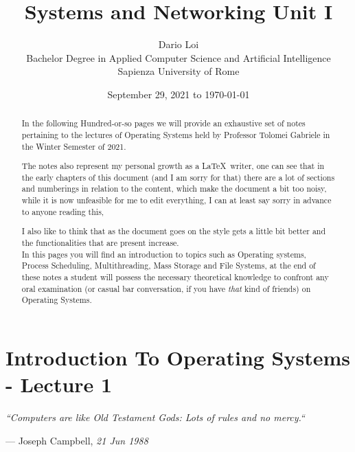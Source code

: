 \documentclass[openright, twoside]{report}
\title{\huge Systems and Networking Unit I}
\date{\small September 29, 2021 to \today}
\author{\large Dario Loi\\[6pt] \medskip \small Bachelor Degree in Applied Computer Science and Artificial Intelligence\\ \medskip  Sapienza University of Rome}
\theoremstyle{definition}
\theoremstyle{example}
\begin{document}
\newcommand{\chapterquote}[3]{ %
	\begin{flushleft}
			\textit{
				``#1``
			}
		\end{flushleft}
		\begin{flushright} 
			--- #2, \textit{#3}
		\end{flushright}
}


\maketitle

\begin{abstract}
    
	In the following Hundred-or-so pages we will provide an 
	exhaustive set of notes pertaining to the lectures of 
	Operating Systems held by Professor Tolomei Gabriele 
	in the Winter Semester of 2021.

	The notes also represent my personal growth as a \LaTeX \ writer, 
	one can see that in the early chapters of this 
	document (and I am sorry for that) there are a lot of 
	sections and numberings in relation to the content, which 
	make the document a bit too noisy, while it is now unfeasible 
	for me to edit everything, I can at least say sorry in advance 
	to anyone reading this,

	I also like to think that as the document goes on the style 
	gets a little bit better and the functionalities that are 
	present increase.\\

	In this pages you will find an introduction to topics such as 
	Operating systems, Process Scheduling, Multithreading, Mass Storage 
	and File Systems, at the end of these notes a student will possess the 
	necessary theoretical knowledge to confront any oral examination 
	(or casual bar conversation, if you have \emph{that} kind of friends)
	on Operating Systems.\\
    
\end{abstract}

\tableofcontents

\chapter{Introduction To Operating Systems - Lecture 1}

\chapterquote{Computers are like Old Testament Gods: Lots of rules and no mercy.}{Joseph Campbell}{21 Jun 1988}
\end{document}
